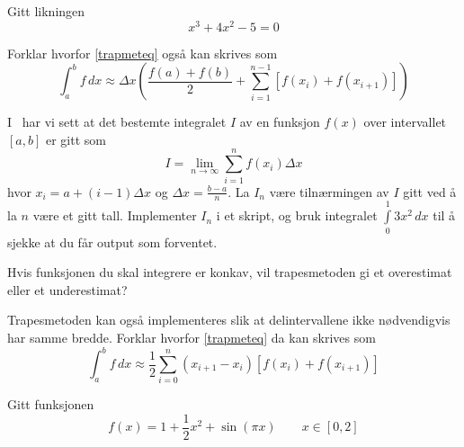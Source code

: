 






\opgt
\nes
{}
Gitt likningen
\[ x^3+4x^2-5=0 \]

\nes

Forklar hvorfor \eqref{trapmeteq} også kan skrives som
\[ \int_{a}^{b} f\,dx \approx \Delta x\left(\frac{f(a)+f(b)}{2}+\sum_{i=1}^{n-1}\left[f(x_i)+f(x_{i+1})\right]\right)  \]

I \tmto\ har vi sett at det bestemte integralet $ I $ av en funksjon $ f(x) $ over intervallet $ [a, b] $ er gitt som
\begin{equation}
	I= \lim\limits_{n\to \infty}\sum\limits_{i=1}^{n} f(x_{i})\Delta x 
\end{equation}
hvor $ {x_i=a+(i-1)\Delta x}$ og $ {\Delta x=\frac{b-a}{n}} $. La $ I_n $ være tilnærmingen av $ I $ gitt ved å la $ n $ være et gitt tall. Implementer $ I_n $ i et skript, og bruk integralet $ \int\limits_{0}^1 3x^2\,dx $ til å sjekke at du får output som forventet.

Hvis funksjonen du skal integrere er konkav, vil trapesmetoden gi et overestimat eller et underestimat?

\newpage
{}
Trapesmetoden kan også implementeres slik at delintervallene ikke nødvendigvis har samme bredde. Forklar hvorfor \eqref{trapmeteq} da kan skrives som
\[ \int_{a}^{b} f\,dx \approx \frac{1}{2}\sum_{i=0}^{n} (x_{i+1}-x_i)\left[f(x_i)+f(x_{i+1})\right]  \]

Gitt funksjonen 
\[ f(x)= 1+\frac{1}{2}x^2+\sin(\pi x) \qquad x\in [0, 2]\]


